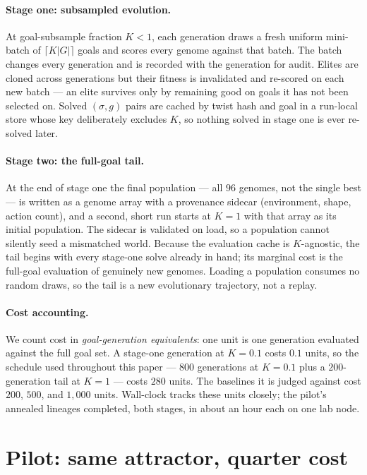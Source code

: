 \documentclass[a4paper, notitlepage, 11pt]{article}
\begin{document}
\paragraph{Stage one: subsampled evolution.}  At goal-subsample fraction
$K < 1$, each generation draws a fresh uniform mini-batch of
$\lceil K \lvert G \rvert \rceil$ goals and scores every genome against
that batch.  The batch changes every generation and is recorded with the
generation for audit.  Elites are cloned across generations but their
fitness is invalidated and re-scored on each new batch --- an elite
survives only by remaining good on goals it has not been selected on.
Solved $(\sigma, g)$ pairs are cached by twist hash and goal in a
run-local store whose key deliberately excludes $K$, so nothing solved in
stage one is ever re-solved later.

\paragraph{Stage two: the full-goal tail.}  At the end of stage one the
final population --- all $96$ genomes, not the single best --- is written
as a genome array with a provenance sidecar (environment, shape, action
count), and a second, short run starts at $K = 1$ with that array as its
initial population.  The sidecar is validated on load, so a population
cannot silently seed a mismatched world.  Because the evaluation cache is
$K$-agnostic, the tail begins with every stage-one solve already in hand;
its marginal cost is the full-goal evaluation of genuinely new genomes.
Loading a population consumes no random draws, so the tail is a new
evolutionary trajectory, not a replay.

\paragraph{Cost accounting.}  We count cost in \emph{goal-generation
equivalents}: one unit is one generation evaluated against the full goal
set.  A stage-one generation at $K = 0.1$ costs $0.1$ units, so the
schedule used throughout this paper --- $800$ generations at $K = 0.1$
plus a $200$-generation tail at $K = 1$ --- costs $280$ units.  The
baselines it is judged against cost $200$, $500$, and $1{,}000$ units.
Wall-clock tracks these units closely; the pilot's annealed lineages
completed, both stages, in about an hour each on one lab node.

\section{Pilot: same attractor, quarter cost}
\label{sec:pilot}
\end{document}
